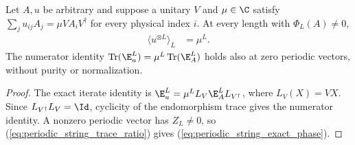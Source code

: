 \begin{lemma}
    \label{thm:periodic_string_exact_phase}
    \leanok
    Let $A,u$ be arbitrary and suppose a unitary $V$ and $\mu\in\C$ satisfy
    $\sum_j u_{ij}A_j=\mu V A_iV^\dagger$ for every physical index $i$.
    At every length with $\Phi_L(A)\ne0$,
    \begin{align}
        \langle u^{\otimes L}\rangle_L & =\mu^L.
        \label{eq:periodic_string_exact_phase}
    \end{align}
    The numerator identity
    $\operatorname{Tr}(\E_u^L)=\mu^L\operatorname{Tr}(\E_A^L)$
    holds also at zero periodic vectors, without purity or normalization.
\end{lemma}
\begin{proof}
    \leanok
    The exact iterate identity is
    $\E_u^L=\mu^L L_V\E_A^L L_{V^\dagger}$, where $L_V(X)=VX$.
    Since $L_{V^\dagger}L_V=\Id$, cyclicity of the endomorphism trace
    gives the numerator identity. A nonzero periodic vector has $Z_L\ne0$,
    so (\ref{eq:periodic_string_trace_ratio}) gives
    (\ref{eq:periodic_string_exact_phase}).
\end{proof}


